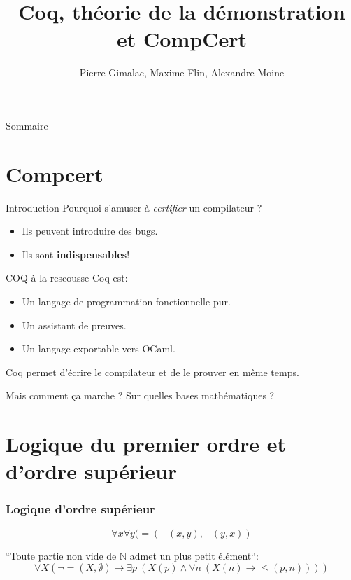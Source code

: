 \documentclass[11pt,a4paper]{beamer}
\title{Coq, théorie de la démonstration et CompCert}
\author{Pierre Gimalac, Maxime Flin, Alexandre Moine}
\theoremstyle{plain}
\theoremstyle{definition}
\theoremstyle{remark}
\begin{document}
\maketitle

\begin{frame}{Sommaire}
\tableofcontents
\end{frame}

\section{Compcert}

\begin{frame}{Introduction}
Pourquoi s'amuser à \textit{certifier} un compilateur ?
\begin{itemize}
	\item Ils peuvent introduire des bugs.
	\item Ils sont \textbf{indispensables}!
\end{itemize}
\end{frame}

\begin{frame}{COQ à la rescousse}
Coq est:
\begin{itemize}
\item Un langage de programmation fonctionnelle pur.
\item Un assistant de preuves.
\item Un langage exportable vers OCaml.
\end{itemize}
Coq permet d'écrire le compilateur et de le prouver en même temps.

Mais comment ça marche ? Sur quelles bases mathématiques ?
\end{frame}

\section{Logique du premier ordre et d'ordre supérieur}
\begin{frame}
\frametitle{Logique d'ordre supérieur}
$$\forall x\forall y (=(+(x,y),+(y,x))$$

``Toute partie non vide de $\mathbb{N}$ admet un plus petit élément``:
\[ \forall X \left(\neg =(X, \emptyset)\rightarrow\exists p~(X(p)\wedge\forall n~(X(n)\rightarrow \leq(p, n)))\right)\]
\end{frame}
\end{document}
